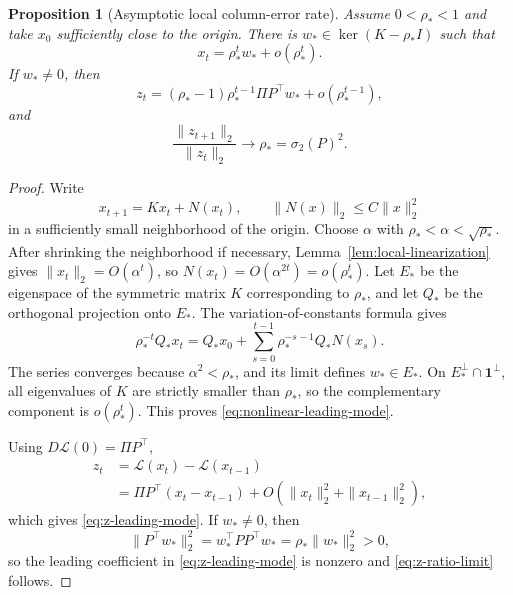 \documentclass[10pt]{article}
\numberwithin{equation}{section}
\theoremstyle{plain}
\newtheorem{proposition}[theorem]{Proposition}
\theoremstyle{definition}
\theoremstyle{remark}
\newcommand{\ones}{\mathbf{1}}
\begin{document}
\begin{proposition}[Asymptotic local column-error rate]\label{prop:local-asymptotic}
Assume \(0<\rho_*<1\) and take \(x_0\) sufficiently close to the origin. There is
\(w_*\in\ker(K-\rho_*I)\) such that
\begin{equation}\label{eq:nonlinear-leading-mode}
        x_t=\rho_*^t w_*+o(\rho_*^t).
\end{equation}
If \(w_*\ne0\), then
\begin{equation}\label{eq:z-leading-mode}
        z_t
        =
        (\rho_*-1)\rho_*^{t-1}\Pi P^\top w_*
        +o(\rho_*^{t-1}),
\end{equation}
and
\begin{equation}\label{eq:z-ratio-limit}
        \frac{\|z_{t+1}\|_2}{\|z_t\|_2}
        \longrightarrow
        \rho_*=\sigma_2(P)^2.
\end{equation}
\end{proposition}

\begin{proof}
Write
\[
        x_{t+1}=Kx_t+N(x_t),
        \qquad
        \|N(x)\|_2\le C\|x\|_2^2
\]
in a sufficiently small neighborhood of the origin. Choose
\(\alpha\) with \(\rho_*<\alpha<\sqrt{\rho_*}\). After shrinking the
neighborhood if necessary, Lemma~\ref{lem:local-linearization} gives
\(\|x_t\|_2=O(\alpha^t)\), so
\(N(x_t)=O(\alpha^{2t})=o(\rho_*^t)\). Let \(E_*\) be the eigenspace of the
symmetric matrix \(K\) corresponding to \(\rho_*\), and let \(Q_*\) be the
orthogonal projection onto \(E_*\). The variation-of-constants formula gives
\[
\rho_*^{-t}Q_*x_t
=
Q_*x_0+
\sum_{s=0}^{t-1}\rho_*^{-s-1}Q_*N(x_s).
\]
The series converges because \(\alpha^2<\rho_*\), and its limit defines
\(w_*\in E_*\). On \(E_*^\perp\cap\ones^\perp\), all eigenvalues of \(K\) are
strictly smaller than \(\rho_*\), so the complementary component is
\(o(\rho_*^t)\). This proves \eqref{eq:nonlinear-leading-mode}.

Using \(D\mathcal L(0)=\Pi P^\top\),
\[
\begin{aligned}
z_t
&=\mathcal L(x_t)-\mathcal L(x_{t-1})\\
&=\Pi P^\top(x_t-x_{t-1})
  +O(\|x_t\|_2^2+\|x_{t-1}\|_2^2),
\end{aligned}
\]
which gives \eqref{eq:z-leading-mode}. If \(w_*\ne0\), then
\[
\|P^\top w_*\|_2^2
=
w_*^\top PP^\top w_*
=
\rho_*\|w_*\|_2^2>0,
\]
so the leading coefficient in \eqref{eq:z-leading-mode} is nonzero and
\eqref{eq:z-ratio-limit} follows.
\end{proof}
\end{document}
